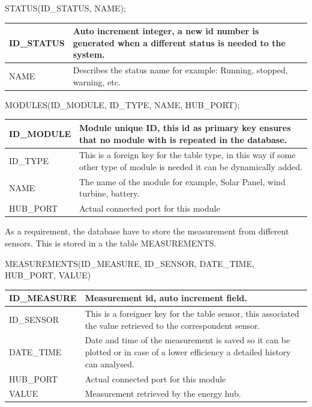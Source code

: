 STATUS(ID\_STATUS, NAME);

\begin{table}[H]
\centering
	\begin{tabular}{| p{2cm} | p{10cm} |}
		\hline
		ID\_STATUS & Auto increment integer, a new id number is generated when a different status is needed to the system. \\\hline
		NAME & Describes the status name for example: Running, stopped, warning, etc.\\\hline
	\end{tabular}
\end{table}


MODULES(ID\_MODULE, ID\_TYPE, NAME, HUB\_PORT);

\begin{table}[H]
\centering
	\begin{tabular}{| p{2.2cm} | p{10cm} |}
		\hline
		ID\_MODULE &  Module unique ID, this id as primary key ensures that no module with is repeated in the database.\\\hline
		ID\_TYPE & This is a foreign key for the table type, in this way if some other type of module is needed it can be dynamically added. \\\hline
		NAME & The name of the module for example, Solar Panel, wind turbine, battery. \\\hline
		HUB\_PORT & Actual connected port for this module\\\hline
	\end{tabular}
\end{table}

As a requirement, the database have to store the measurement  from different sensors. This is stored in a the table MEASUREMENTS.

MEASUREMENTS(ID\_MEASURE, ID\_SENSOR, DATE\_TIME, HUB\_PORT, VALUE)

\begin{table}[H]
\centering
	\begin{tabular}{| p{2.2cm} | p{10cm} |}
		\hline
		ID\_MEASURE &  Measurement id, auto increment field.\\\hline
		ID\_SENSOR & This is a foreigner key for the table sensor, this associated the value retrieved to the correspondent sensor. \\\hline
		DATE\_TIME & Date and time of the measurement is saved so it can be plotted or in case of a lower efficiency a detailed history can analysed. \\\hline
		HUB\_PORT & Actual connected port for this module\\\hline
		VALUE & Measurement retrieved by the energy hub.\\\hline
	\end{tabular}
\end{table}

